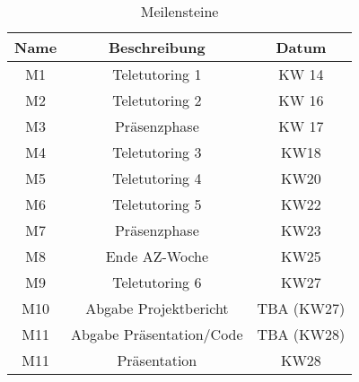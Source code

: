  
 \begin{table}[h]
    \centering
    \begin{tabular}{|c || c c|} 
        \hline
        Name     & Beschreibung     & Datum     \\ 
        \hline \hline
        M1         & Teletutoring 1        & KW 14         \\ 
        M2 & Teletutoring 2	& KW 16\\ 
M3 & Präsenzphase	& KW 17\\ 
M4 & Teletutoring 3	& KW18\\ 
M5 &Teletutoring 4	&KW20\\ 
M6 &Teletutoring 5	&KW22\\ 
M7 &Präsenzphase	&KW23\\
M8 &Ende AZ-Woche	&KW25\\
M9 &Teletutoring 6	&KW27\\ 
M10 &Abgabe Projektbericht	&TBA (KW27)\\ 
M11 &Abgabe Präsentation/Code	&TBA (KW28)\\ 
M11 &Präsentation	& KW28\\ \hline
    \end{tabular}
    
    \caption{Meilensteine}
    
    \label{tab:milestones}
\end{table}